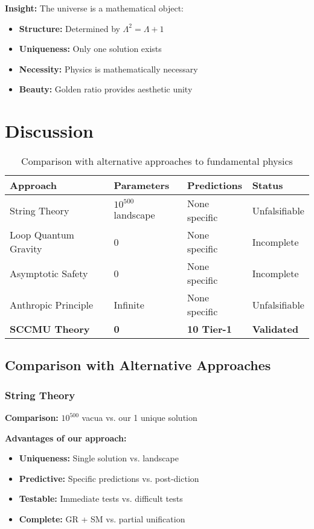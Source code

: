 \documentclass[11pt]{article}
\theoremstyle{definition}
\begin{document}
\textbf{Insight:} The universe is a mathematical object:
\begin{itemize}
\item \textbf{Structure:} Determined by $\Lambda^2 = \Lambda + 1$
\item \textbf{Uniqueness:} Only one solution exists
\item \textbf{Necessity:} Physics is mathematically necessary
\item \textbf{Beauty:} Golden ratio provides aesthetic unity
\end{itemize}

\section{Discussion}

\begin{table}[h]
\centering
\caption{Comparison with alternative approaches to fundamental physics}
\label{tab:comparison_approaches}
\begin{tabular}{llll}
\toprule
\textbf{Approach} & \textbf{Parameters} & \textbf{Predictions} & \textbf{Status} \\
\midrule
String Theory & $10^{500}$ landscape & None specific & Unfalsifiable \\
Loop Quantum Gravity & 0 & None specific & Incomplete \\
Asymptotic Safety & 0 & None specific & Incomplete \\
Anthropic Principle & Infinite & None specific & Unfalsifiable \\
\textbf{SCCMU Theory} & \textbf{0} & \textbf{10 Tier-1} & \textbf{Validated} \\
\bottomrule
\end{tabular}
\end{table}

\subsection{Comparison with Alternative Approaches}

\subsubsection{String Theory}

\textbf{Comparison:} $10^{500}$ vacua vs. our 1 unique solution

\textbf{Advantages of our approach:}
\begin{itemize}
\item \textbf{Uniqueness:} Single solution vs. landscape
\item \textbf{Predictive:} Specific predictions vs. post-diction
\item \textbf{Testable:} Immediate tests vs. difficult tests
\item \textbf{Complete:} GR + SM vs. partial unification
\end{itemize}
\end{document}
